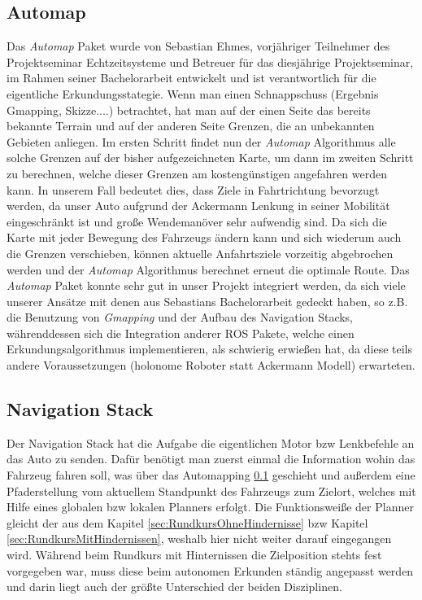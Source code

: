 \subsection{Automap}
\label{subsec:automap}
Das \textit{Automap} Paket wurde von Sebastian Ehmes, vorjähriger Teilnehmer des Projektseminar Echtzeitsysteme und Betreuer für das diesjährige Projektseminar, im Rahmen seiner Bachelorarbeit entwickelt und ist verantwortlich für die eigentliche Erkundungsstategie. Wenn man einen Schnappschuss (Ergebnis Gmapping, Skizze....) betrachtet, hat man auf der einen Seite das bereits bekannte Terrain und auf der anderen Seite Grenzen, die an unbekannten Gebieten anliegen. Im ersten Schritt findet nun der \textit{Automap} Algorithmus alle solche Grenzen auf der bisher aufgezeichneten Karte, um dann im zweiten Schritt zu berechnen, welche dieser Grenzen am kostengünstigen angefahren werden kann. In unserem Fall bedeutet dies, dass Ziele in Fahrtrichtung bevorzugt werden, da unser Auto aufgrund der Ackermann Lenkung in seiner Mobilität eingeschränkt ist und große Wendemanöver sehr aufwendig sind. Da sich die Karte mit jeder Bewegung des Fahrzeugs ändern kann und sich wiederum auch die Grenzen verschieben, können aktuelle Anfahrtsziele vorzeitig abgebrochen werden und der \textit{Automap} Algorithmus berechnet erneut die optimale Route. Das \textit{Automap} Paket konnte sehr gut in unser Projekt integriert werden, da sich viele unserer Ansätze mit denen aus Sebastians Bachelorarbeit gedeckt haben, so z.B. die Benutzung von \textit{Gmapping} und der Aufbau des Navigation Stacks, währenddessen sich die Integration anderer ROS Pakete, welche einen Erkundungsalgorithmus implementieren, als schwierig erwießen hat, da diese teils andere Voraussetzungen (holonome Roboter statt Ackermann Modell) erwarteten.

\subsection{Navigation Stack}
\label{subsec:navigationstack}
Der Navigation Stack hat die Aufgabe die eigentlichen Motor bzw Lenkbefehle an das Auto zu senden. Dafür benötigt man zuerst einmal die Information wohin das Fahrzeug fahren soll, was über das Automapping \ref{subsec:automap} geschieht und außerdem eine Pfaderstellung vom aktuellem Standpunkt des Fahrzeugs zum Zielort, welches mit Hilfe eines globalen bzw lokalen Planners erfolgt. Die Funktionsweiße der Planner gleicht der aus dem Kapitel \ref{sec:RundkursOhneHindernisse} bzw Kapitel  \ref{sec:RundkursMitHindernissen}, weshalb hier nicht weiter darauf eingegangen wird. Während beim Rundkurs mit Hinternissen die Zielposition stehts fest vorgegeben war, muss diese beim autonomen Erkunden ständig angepasst werden und darin liegt auch der größte Unterschied der beiden Disziplinen. 

